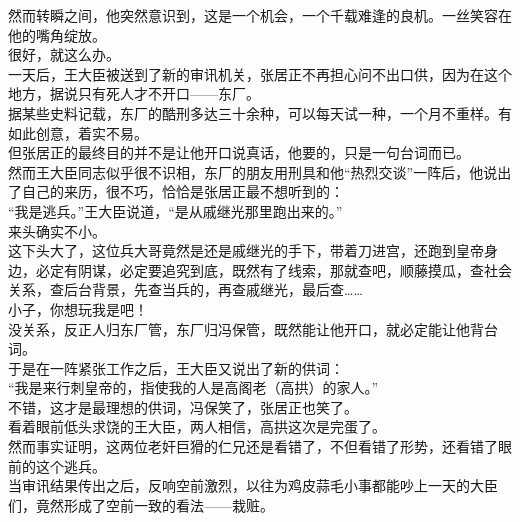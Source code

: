 \begin{multicols}{\theparacolNo}
然而转瞬之间，他突然意识到，这是一个机会，一个千载难逢的良机。一丝笑容在他的嘴角绽放。\\

很好，就这么办。\\

一天后，王大臣被送到了新的审讯机关，张居正不再担心问不出口供，因为在这个地方，据说只有死人才不开口——东厂。\\

据某些史料记载，东厂的酷刑多达三十余种，可以每天试一种，一个月不重样。有如此创意，着实不易。\\

但张居正的最终目的并不是让他开口说真话，他要的，只是一句台词而已。\\

然而王大臣同志似乎很不识相，东厂的朋友用刑具和他“热烈交谈”一阵后，他说出了自己的来历，很不巧，恰恰是张居正最不想听到的：\\

“我是逃兵。”王大臣说道，“是从戚继光那里跑出来的。”\\

来头确实不小。\\

这下头大了，这位兵大哥竟然是还是戚继光的手下，带着刀进宫，还跑到皇帝身边，必定有阴谋，必定要追究到底，既然有了线索，那就查吧，顺藤摸瓜，查社会关系，查后台背景，先查当兵的，再查戚继光，最后查……\\

小子，你想玩我是吧！\\

没关系，反正人归东厂管，东厂归冯保管，既然能让他开口，就必定能让他背台词。\\

于是在一阵紧张工作之后，王大臣又说出了新的供词：\\

“我是来行刺皇帝的，指使我的人是高阁老（高拱）的家人。”\\

不错，这才是最理想的供词，冯保笑了，张居正也笑了。\\

看着眼前低头求饶的王大臣，两人相信，高拱这次是完蛋了。\\

然而事实证明，这两位老奸巨猾的仁兄还是看错了，不但看错了形势，还看错了眼前的这个逃兵。\\

当审讯结果传出之后，反响空前激烈，以往为鸡皮蒜毛小事都能吵上一天的大臣们，竟然形成了空前一致的看法——栽赃。\\


\end{multicols}
